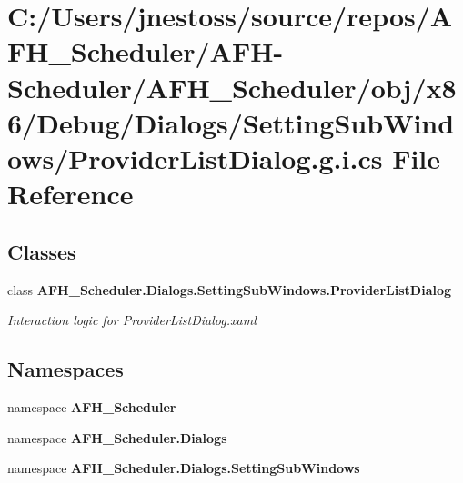 \section{C\+:/\+Users/jnestoss/source/repos/\+A\+F\+H\+\_\+\+Scheduler/\+A\+F\+H-\/\+Scheduler/\+A\+F\+H\+\_\+\+Scheduler/obj/x86/\+Debug/\+Dialogs/\+Setting\+Sub\+Windows/\+Provider\+List\+Dialog.g.\+i.\+cs File Reference}
\label{x86_2_debug_2_dialogs_2_setting_sub_windows_2_provider_list_dialog_8g_8i_8cs}
\subsection*{Classes}
\begin{DoxyCompactItemize}
\item 
class \textbf{ A\+F\+H\+\_\+\+Scheduler.\+Dialogs.\+Setting\+Sub\+Windows.\+Provider\+List\+Dialog}
\begin{DoxyCompactList}\small\item\em Interaction logic for Provider\+List\+Dialog.\+xaml \end{DoxyCompactList}\end{DoxyCompactItemize}
\subsection*{Namespaces}
\begin{DoxyCompactItemize}
\item 
namespace \textbf{ A\+F\+H\+\_\+\+Scheduler}
\item 
namespace \textbf{ A\+F\+H\+\_\+\+Scheduler.\+Dialogs}
\item 
namespace \textbf{ A\+F\+H\+\_\+\+Scheduler.\+Dialogs.\+Setting\+Sub\+Windows}
\end{DoxyCompactItemize}
